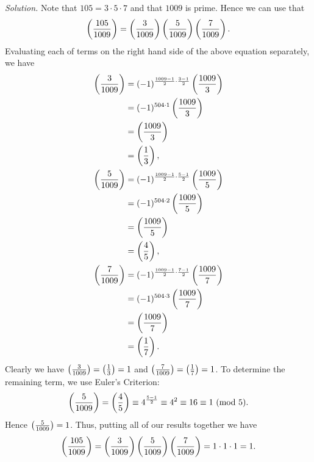 \documentclass{article}
\newcommand{\Mod}[1]{\ (\mathrm{mod}\ #1)}
\newcommand{\Leg}[2]{\del{\frac{#1}{#2}}}
\begin{document}
\textit{Solution.}
Note that $105 = 3 \cdot 5 \cdot 7$ and that $1009$ is prime.
Hence we can use that
%
\begin{equation*}
    \Leg{105}{1009} = \Leg{3}{1009} \Leg{5}{1009} \Leg{7}{1009}
    .
\end{equation*}
%
Evaluating each of terms on the right hand side of the above equation separately,
we have
%
\begin{align*}
    \Leg{3}{1009}
    &= (-1)^{\frac{1009 - 1}{2} \cdot \frac{3 - 1}{2}} \Leg{1009}{3} \\
    &= (-1)^{504 \cdot 1} \Leg{1009}{3} \\
    &= \Leg{1009}{3} \\
    &= \Leg{1}{3}, \\
    \Leg{5}{1009}
    &= (-1)^{\frac{1009 - 1}{2} \cdot \frac{5 - 1}{2}} \Leg{1009}{5} \\
    &= (-1)^{504 \cdot 2} \Leg{1009}{5} \\
    &= \Leg{1009}{5} \\
    &= \Leg{4}{5}, \\
    \Leg{7}{1009}
    &= (-1)^{\frac{1009 - 1}{2} \cdot \frac{7 - 1}{2}} \Leg{1009}{7} \\
    &= (-1)^{504 \cdot 3} \Leg{1009}{7} \\
    &= \Leg{1009}{7} \\
    &= \Leg{1}{7}.
\end{align*}
%
Clearly we have $\Leg{3}{1009} = \Leg{1}{3} = 1$ and $\Leg{7}{1009} = \Leg{1}{7} = 1$.
To determine the remaining term, we use Euler's Criterion:
%
\begin{equation*}
    \Leg{5}{1009} = \Leg{4}{5} \equiv 4^{\frac{5 - 1}{2}} \equiv 4^2 \equiv 16 \equiv 1 \Mod{5}
    .
\end{equation*}
%
Hence $\Leg{5}{1009} = 1$. Thus, putting all of our results together we have
%
\begin{equation*}
    \Leg{105}{1009}
    = \Leg{3}{1009} \Leg{5}{1009} \Leg{7}{1009}
    = 1 \cdot 1 \cdot 1
    = 1
    .
\end{equation*}
\end{document}
